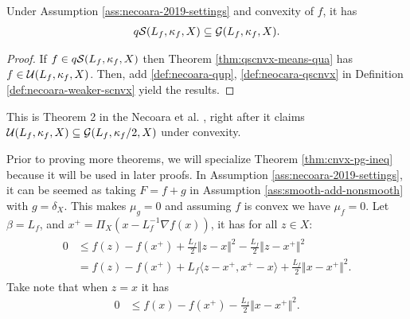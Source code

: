\documentclass[12pt]{report}
\begin{document}
            \begin{theorem}\label{thm:qscnvx-implies-qgg}
                Under Assumption \ref{ass:necoara-2019-settings} and convexity of $f$, it has 
                \begin{align*}
                    q\mathcal{S}(L_f, \kappa_f, X) \subseteq \mathcal G (L_f, \kappa_f, X). 
                \end{align*}
            \end{theorem}
            \begin{proof}
                If $f \in q\mathcal{S} (L_f, \kappa_f, X)$ then Theorem \ref{thm:qscnvx-means-qua} has $f \in \mathcal U(L_f, \kappa_f, X)$. 
                Then, add \ref{def:necoara-qup}, \ref{def:neocara-qscnvx} in Definition \ref{def:necoara-weaker-scnvx} yield the results. 
            \end{proof}
            \begin{remark}
                This is Theorem 2 in the Necoara et al. \cite{necoara_linear_2019}, right after it claims $\mathcal U (L_f, \kappa_f, X)\subseteq \mathcal G (L_f, \kappa_f/2, X)$ under convexity. 
            \end{remark}
            \par
            Prior to proving more theorems, we will specialize Theorem \ref{thm:cnvx-pg-ineq} because it will be used in later proofs. 
            In Assumption \ref{ass:necoara-2019-settings}, it can be seemed as taking $F = f + g$ in Assumption \ref{ass:smooth-add-nonsmooth} with $g = \delta_{X}$. 
            This makes $\mu_g = 0$ and assuming $f$ is convex we have $\mu_f = 0$. 
            Let $\beta = L_f$, and $x^+ = \Pi_{X}(x - L_f^{-1}\nabla f(x))$, it has for all $z \in X$: 
            \begin{align}\label{ineq:proj-grad}
                \begin{split}
                    0 &\le 
                    f(z) - f(x^+) + \frac{L_f}{2}\Vert z - x\Vert^2
                    - \frac{L_f}{2}\Vert z - x^+\Vert^2
                    \\
                    &= 
                    f(z) - f(x^+) + L_f\langle z - x^+, x^+ - x\rangle
                    + \frac{L_f}{2}\Vert x - x^+\Vert^2. 
                \end{split}
            \end{align}
            Take note that when $z = x$ it has 
            \begin{align}\label{ineq:proj-grad2}
                0 &\le f(x) - f(x^+) - \frac{L_f}{2}\Vert x - x^+\Vert^2. 
            \end{align}
\end{document}
